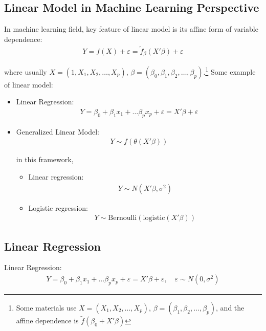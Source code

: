 \subsection{Linear Model in Machine Learning Perspective}
    In machine learning field, key feature of linear model is its affine form of variable dependence:
    \begin{align}
        Y=f(X)+\varepsilon = \tilde{f}_\beta (X'\beta )+\varepsilon  
    \end{align}

    where usually $ X=(1,X_{1},X_{2},\ldots,X_{p}) $, $ \beta =(\beta _0,\beta _{1},\beta _{2},\ldots,\beta _{p})  $.\footnote{Some materials use  $ X=(X_{1},X_{2},\ldots,X_{p}) $, $ \beta =(\beta _{1},\beta _{2},\ldots,\beta _{p})  $, and the affine dependence is $ \tilde{f}(\beta _0+X'\beta ) $} Some example of linear model:
    \begin{itemize}[topsep=2pt,itemsep=0pt]
        \item Linear Regression:
        \begin{align}
            Y=\beta _0 +\beta _1x_1+\ldots \beta _px_p+\varepsilon =X'\beta +\varepsilon 
        \end{align}
        \item Generalized Linear Model:
        \begin{align}
            Y\sim f(\theta (X'\beta ))  
        \end{align}

        in this framework, 
        \begin{itemize}[topsep=2pt,itemsep=0pt]
            \item Linear regression:
            \begin{align}
                Y\sim N(X'\beta ,\sigma ^2) 
            \end{align}
            \item Logistic regression:
            \begin{align}
                Y\sim \mathrm{Bernoulli}(\mathrm{logistic}(X'\beta ) )  
            \end{align}
        \end{itemize}
    \end{itemize}
    
  
\subsection{Linear Regression}
    Linear Regression:
    \begin{align}
        Y=\beta _0 +\beta _1x_1+\ldots \beta _px_p+\varepsilon =X'\beta +\varepsilon ,\quad \varepsilon \sim N(0,\sigma ^2)
    \end{align}
    
